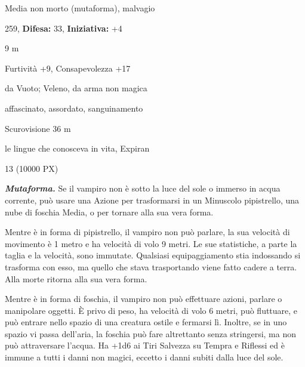 \begin{multicols}{2}
{
\noindent
\begin{description}[noitemsep, topsep=0pt, parsep=0pt, partopsep=0pt, leftmargin=0cm, labelwidth=2.2cm]
	\item[\textbf{Taglia/Tipo:}] Media non morto (mutaforma), malvagio
	\item[\textbf{Caratt.:}] 
	\item[\textbf{Punti Ferita:}] 259,  \textbf{Difesa:} 33,  \textbf{Iniziativa:} +4
	\item[\textbf{Movimento:}] 9 m
	\item[\textbf{Tiri Salvez.:}] 
	\item[\textbf{Comp.:}] Furtività +9, Consapevolezza +17
	\item[\textbf{Imm. Danni:}] da Vuoto; Veleno, da arma non magica
	\item[\textbf{Immunità:}] affascinato, assordato, sanguinamento
	\item[\textbf{Sensi:}] Scurovisione 36 m
	\item[\textbf{Linguaggi:}] le lingue che conosceva in vita, Expiran
	\item[\textbf{Sfida:}] 13 (10000 PX)\smallskip
\end{description}

\emph{\textbf{Mutaforma.}} Se il vampiro non è sotto la luce del sole o immerso in acqua corrente, può usare una Azione per trasformarsi in un Minuscolo pipistrello, una nube di foschia Media, o per tornare alla sua vera forma.

Mentre è in forma di pipistrello, il vampiro non può parlare, la sua velocità di movimento è 1 metro e ha velocità di volo 9 metri. Le sue statistiche, a parte la taglia e la velocità, sono immutate. Qualsiasi equipaggiamento stia indossando si trasforma con esso, ma quello che stava trasportando viene fatto cadere a terra. Alla morte ritorna alla sua vera forma.

Mentre è in forma di foschia, il vampiro non può effettuare azioni, parlare o manipolare oggetti. È privo di peso, ha velocità di volo 6 metri, può fluttuare, e può entrare nello spazio di una creatura ostile e fermarsi lì. Inoltre, se in uno spazio vi passa dell'aria, la foschia può fare altrettanto senza stringersi, ma non può attraversare l'acqua. Ha +1d6 ai Tiri Salvezza su Tempra e Riflessi ed è immune a tutti i danni non magici, eccetto i danni subiti dalla luce del
sole.

}
\end{multicols}
